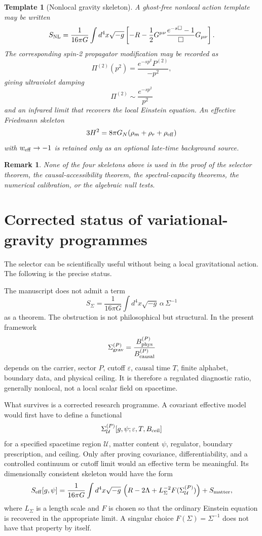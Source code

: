 \documentclass[11pt,a4paper]{article}
\newtheorem{remark}[theorem]{Remark}
\newtheorem{template}[theorem]{Template}
\newcommand{\Boxop}{\Box}
\begin{document}
\begin{template}[Nonlocal gravity skeleton]
A ghost-free nonlocal action template may be written
\[
S_{\rm NL}
=
\frac{1}{16\pi G}
\int d^4x\sqrt{-g}
\left[
-R-\frac12G^{\mu\nu}
\frac{e^{-s\Boxop}-1}{\Boxop}G_{\mu\nu}
\right].
\]
The corresponding spin-2 propagator modification may be recorded as
\[
\Pi^{(2)}(p^2)
=
\frac{e^{-sp^2}P^{(2)}}{-p^2},
\]
giving ultraviolet damping
\[
\Pi^{(2)}\sim \frac{e^{-sp^2}}{p^2}
\]
and an infrared limit that recovers the local Einstein equation.  An effective Friedmann skeleton
\[
3H^2=8\pi G_N(\rho_m+\rho_r+\rho_{\rm eff})
\]
with $w_{\rm eff}\to-1$ is retained only as an optional late-time background source.
\end{template}

\begin{remark}
None of the four skeletons above is used in the proof of the selector theorem, the causal-accessibility theorem, the spectral-capacity theorems, the numerical calibration, or the algebraic null tests.
\end{remark}


\section{Corrected status of variational-gravity programmes}
\label{sec:corrected-variational-gravity-status}

The selector can be scientifically useful without being a local gravitational action.
The following is the precise status.

The manuscript does not admit a term
\[
S_{\Sigma}
=
\frac{1}{16\pi G}
\int d^4x\sqrt{-g}\,\alpha\,\Sigma^{-1}
\]
as a theorem.  The obstruction is not philosophical but structural.  In the present framework
\[
\Sigma_{\rm grav}^{(P)}
=
\frac{B_{\rm phys}^{(P)}}{B_{\rm causal}^{(P)}}
\]
depends on the carrier, sector \(P\), cutoff \(\varepsilon\), causal time \(T\), finite alphabet, boundary data, and physical ceiling.  It is therefore a regulated diagnostic ratio, generally nonlocal, not a local scalar field on spacetime.

What survives is a corrected research programme.  A covariant effective model would first have to define a functional
\[
\Sigma_{\mathcal U}^{(P)}[g,\psi;\varepsilon,T,B_{\rm ceil}]
\]
for a specified spacetime region \(\mathcal U\), matter content \(\psi\), regulator, boundary prescription, and ceiling.  Only after proving covariance, differentiability, and a controlled continuum or cutoff limit would an effective term be meaningful.  Its dimensionally consistent skeleton would have the form
\[
S_{\rm eff}[g,\psi]
=
\frac{1}{16\pi G}
\int d^4x\sqrt{-g}\,
\left(
R-2\Lambda+L_{\Sigma}^{-2}F(\Sigma_{\mathcal U}^{(P)})
\right)
+
S_{\rm matter},
\]
where \(L_{\Sigma}\) is a length scale and \(F\) is chosen so that the ordinary Einstein equation is recovered in the appropriate limit.  A singular choice \(F(\Sigma)=\Sigma^{-1}\) does not have that property by itself.
\end{document}
